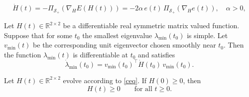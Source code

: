 \documentclass[10pt,a4paper]{amsart}
\begin{document}
\begin{equation}\label{ceq}
\dot H(t) = - \Pi_{\mathcal{S}_+}(\nabla_H E(H(t))) = -2 \alpha\, e(t)\, \Pi_{\mathcal{S}_+}(\nabla_H e(t)), \quad \alpha>0,
\end{equation}

\begin{lemma} \label{lemma 1}  
Let $H(t)\in \mathbb{R}^{2\times 2}$ be a differentiable real symmetric matrix valued function. Suppose that for some $t_{0}$ the smallest eigenvalue 
$\lambda_{\min}(t_{0})$ is simple. Let $v_{\min}(t)$ be the corresponding 
unit eigenvector chosen smoothly near $t_{0}$. Then the function 
$\lambda_{\min}(t)$ is differentiable at $t_{0}$ and satisfies
\begin{equation}\label{dotl}
\dot{\lambda}_{\min}(t_{0})
=
v_{\min}(t_{0})^{\top}\dot{H}(t_{0})\, v_{\min}(t_{0}).
\end{equation}
\end{lemma}

\begin{theorem}
Let $H(t)\in\mathbb{R}^{2\times 2}$ evolve according to \eqref{ceq}.  
If $H(0)\geq 0$, then
\[
H(t)\geq 0 \qquad \text{for all } t\ge 0.
\]
\end{theorem}
\end{document}
